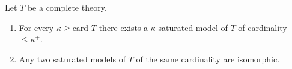 Let $T$ be a complete theory.

\begin{enumerate}
  \item[(i)] For every $\kappa \geq \text{card } T$ there exists a $\kappa$-saturated model of $T$ of cardinality $\leq \kappa^+$.
  \item[(ii)] Any two saturated models of $T$ of the same cardinality are isomorphic.
\end{enumerate}
